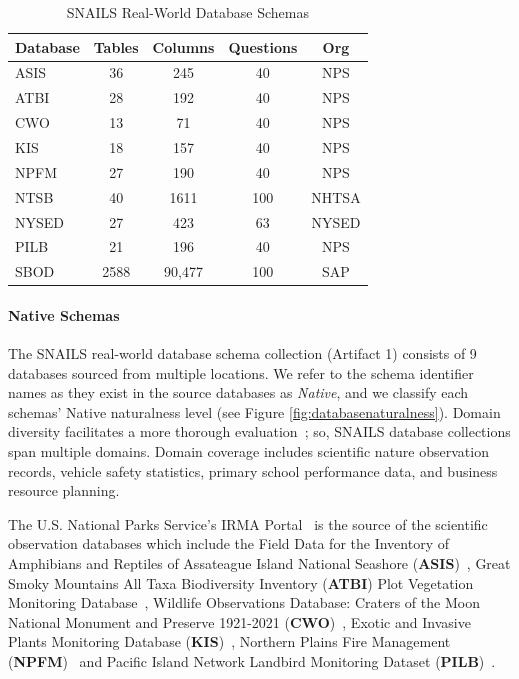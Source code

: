 \begin{table}[t]
  \centering
  \caption{SNAILS Real-World Database Schemas}
  \begin{tabular}{p{2cm}cccc}
  \toprule
  \textbf{Database} & \textbf{Tables} & \textbf{Columns} & \textbf{Questions} & \textbf{Org} \\
  \midrule
  ASIS & 36 & 245 & 40 & NPS \\
  ATBI & 28 & 192 & 40 & NPS \\
  CWO & 13 & 71 & 40 & NPS \\
  KIS & 18 & 157 & 40 & NPS \\
  NPFM & 27 & 190 & 40 & NPS \\
  NTSB & 40 & 1611 & 100 & NHTSA \\
  NYSED & 27 & 423 & 63 & NYSED \\
  PILB & 21 & 196 & 40 & NPS \\
  SBOD & 2588 & 90,477 & 100 & SAP \\
  \bottomrule
  \end{tabular}
  \label{table:benchmarkschemas}
\end{table}

\paragraph{\textbf{Native Schemas}}
The SNAILS real-world database schema collection (Artifact 1) consists of 9 databases sourced from multiple locations.
We refer to the schema identifier names as they exist in the source databases as \emph{Native}, and we classify each schemas' Native naturalness level (see Figure \ref{fig:databasenaturalness}).
Domain diversity facilitates a more thorough evaluation~\cite{finegan-dollak-etal-2018-improving}; so, SNAILS database collections span multiple domains.
Domain coverage includes scientific nature observation records, vehicle safety statistics, primary school performance data, and business resource planning.

The U.S. National Parks Service's IRMA Portal~\cite{nps-irma-portal} is the source of the scientific observation databases which include the 
Field Data for the Inventory of Amphibians and Reptiles of Assateague Island National Seashore (\textbf{ASIS})~\cite{assateague-herp}, 
Great Smoky Mountains All Taxa Biodiversity Inventory (\textbf{ATBI}) Plot Vegetation Monitoring Database~\cite{gsmnp-atbi}, 
Wildlife Observations Database: Craters of the Moon National Monument and Preserve 1921-2021 (\textbf{CWO})~\cite{craters-of-the-moon-wildlife}, 
Exotic and Invasive Plants Monitoring Database (\textbf{KIS})~\cite{klamath-inventory}, 
Northern Plains Fire Management (\textbf{NPFM})~\cite{ngp-fire}
and Pacific Island Network Landbird Monitoring Dataset (\textbf{PILB})~\cite{pilb-dataset}. 

